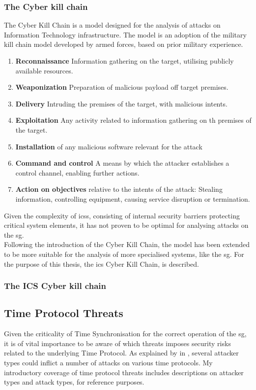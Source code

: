 \cite{khan2017stride}


\subsubsection{The Cyber kill chain}
The Cyber Kill Chain is a model designed for the analysis of attacks on Information Technology infrastructure. The model is an adoption of the military kill chain model developed by armed forces, based on prior military experience.
\begin{enumerate}
    \item \textbf{Reconnaissance} Information gathering on the target, utilising publicly available resources.
    \item \textbf{Weaponization} Preparation of malicious payload off target premises.
    \item \textbf{Delivery} Intruding the premises of the target, with malicious intents.  
    \item \textbf{Exploitation} Any activity related to information gathering on th premises of the target.
    \item \textbf{Installation} of any malicious software relevant for the attack
    \item \textbf{Command and control} A means by which the attacker establishes a control channel, enabling further actions.
    \item \textbf{Action on objectives} relative to the intents of the attack: Stealing information, controlling equipment, causing service disruption or termination.
\end{enumerate}
Given the complexity of \acrlong{ics}s, consisting of internal security barriers protecting critical system elements, it has not proven to be optimal for analysing attacks on the \acrshort{sg}.\\ 

Following the introduction of the Cyber Kill Chain, the model has been extended to be more suitable for the analysis of more specialised systems, like the \acrshort{sg}.
For the purpose of this thesis, the \acrfull{ics} Cyber Kill Chain, is described.
\subsubsection{The ICS Cyber kill chain}



\subsection{Time Protocol Threats}
Given the criticality of Time Synchronisation for the correct operation of the \acrshort{sg}, it is of vital importance to be aware of which threats imposes security risks related to the underlying Time Protocol. As explained by \citeauthor{mizrahi2014security} in \Cite{mizrahi2014security}, several attacker types could inflict a number of attacks on various time protocols. My introductory coverage of time protocol threats includes descriptions on attacker types and attack types, for reference purposes.

